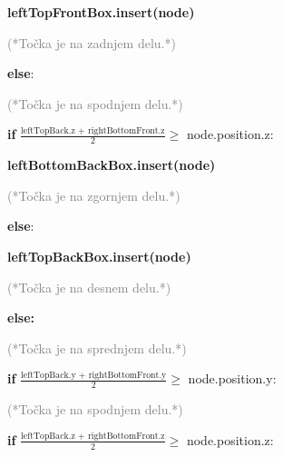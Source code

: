 \documentclass[fleqn]{article}
\begin{document}
\hspace{4cm} \textbf{leftTopFrontBox.insert(node)}

\vspace{2mm}
\hspace{2cm} \textcolor{gray}{(*Točka je na zadnjem delu.*)} 

\vspace{2mm}
\hspace{2cm}  \textbf{else}: 


\vspace{2mm}
\hspace{3cm} \textcolor{gray}{(*Točka je na spodnjem delu.*)} 

\vspace{2mm}
\hspace{3cm}  \textbf{if} $\frac{\text{leftTopBack.z + rightBottomFront.z}}{2} \geq$ node.position.z:

\hspace{4cm} \textbf{leftBottomBackBox.insert(node)}

\vspace{2mm}
\hspace{3cm} \textcolor{gray}{(*Točka je na zgornjem delu.*)} 

\vspace{2mm}
\hspace{3cm}  \textbf{else}: 

\hspace{4cm} \textbf{leftTopBackBox.insert(node)}

\vspace{2mm}
\hspace{1cm} \textcolor{gray}{(*Točka je na desnem delu.*)} 

\vspace{2mm}
\hspace{1cm}  \textbf{else:}

\vspace{2mm}
\hspace{2cm} \textcolor{gray}{(*Točka je na sprednjem delu.*)} 

\vspace{2mm}
\hspace{2cm}  \textbf{if} $\frac{\text{leftTopBack.y + rightBottomFront.y}}{2} \geq$ node.position.y:

\vspace{2mm}
\hspace{3cm} \textcolor{gray}{(*Točka je na spodnjem delu.*)} 

\vspace{2mm}
\hspace{3cm}  \textbf{if} $\frac{\text{leftTopBack.z + rightBottomFront.z}}{2} \geq$ node.position.z:
\end{document}
